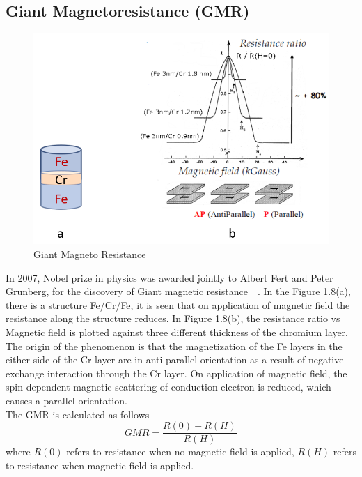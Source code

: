 \documentclass[12pt,a4paper,bold]{thesis}
\theoremstyle{thm}
\theoremstyle{definition}
\begin{document}
\subsection{Giant Magnetoresistance (GMR)}
\begin{figure}[H]
	\centering
   \includegraphics[scale=0.56]{Images/25.png} 
   \caption{Giant Magneto Resistance}
\end{figure}
In 2007, Nobel prize in physics was awarded jointly to Albert Fert and Peter Grunberg, for the discovery of Giant magnetic resistance~\cite{baibich1988giant}~\cite{binasch1989enhanced}. In the Figure 1.8(a), there is a structure Fe/Cr/Fe, it is seen that on application of magnetic field the resistance along the structure reduces. In Figure 1.8(b), the resistance ratio vs Magnetic field is plotted against three different thickness of  the chromium layer.\\
The origin of the phenomenon is that the magnetization of the Fe layers in the either side of the Cr layer are in anti-parallel orientation as a result of negative exchange interaction through the Cr layer. On application of magnetic field, the spin-dependent magnetic scattering of conduction electron is reduced, which causes a parallel orientation.\\
The GMR is calculated as follows
\[GMR=\frac{R(0)-R(H)}{R(H)}\]
where $R(0)$ refers to resistance when no magnetic field is applied, $R(H)$ refers to resistance when magnetic field is applied.
\end{document}
